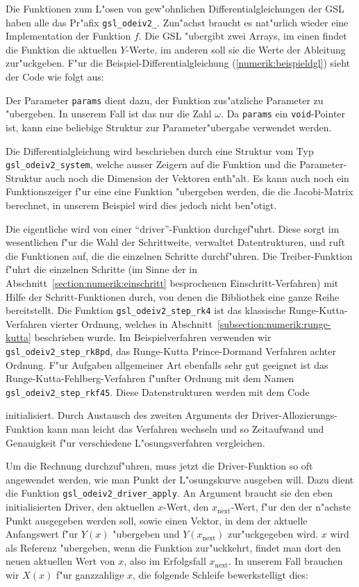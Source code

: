 Die Funktionen zum L"osen von gew"ohnlichen Differentialgleichungen
der GSL haben alle das Pr"afix \texttt{gsl\_odeiv2\_}. 
Zun"achst braucht es nat"urlich wieder eine Implementation der
Funktion $f$. 
Die GSL "ubergibt zwei Arrays, im einen findet die Funktion die aktuellen
$Y$-Werte, im anderen soll sie die Werte der Ableitung zur"uckgeben.
F"ur die Beispiel-Differentialgleichung (\ref{numerik:beispieldgl})
sieht der Code wie folgt aus:

Der Parameter \texttt{params} dient dazu, der Funktion zus"atzliche
Parameter zu "ubergeben.
In unserem Fall ist das nur die Zahl $\omega$.
Da \texttt{params} ein \texttt{void}-Pointer ist, kann eine beliebige
Struktur zur Parameter"ubergabe verwendet werden.

Die Differentialgleichung wird beschrieben durch eine Struktur vom Typ
\texttt{gsl\_odeiv2\_system}, welche ausser Zeigern auf die Funktion
und die Parameter-Struktur auch noch die Dimension der Vektoren enth"alt.
Es kann auch noch ein Funktionszeiger f"ur eine eine Funktion "ubergeben
werden, die die Jacobi-Matrix berechnet, in unserem Beispiel wird dies
jedoch nicht ben"otigt.

Die eigentliche wird von einer ``driver''-Funktion durchgef"uhrt.
Diese sorgt im wesentlichen f"ur die Wahl der Schrittweite, verwaltet
Datentrukturen, und ruft die Funktionen auf, die die einzelnen Schritte
durchf"uhren.
Die Treiber-Funktion f"uhrt die einzelnen Schritte (im Sinne der
in Abschnitt~\ref{section:numerik:einschritt} besprochenen
Einschritt-Verfahren) mit
Hilfe der Schritt-Funktionen durch, von denen die Bibliothek eine
ganze Reihe bereitstellt.
Die Funktion \texttt{gsl\_odeiv2\_step\_rk4} ist das klassische
Runge-Kutta-Verfahren vierter Ordnung, welches in
Abschnitt~\ref{subsection:numerik:runge-kutta}
beschrieben wurde.
Im Beispielverfahren verwenden wir \texttt{gsl\_odeiv2\_step\_rk8pd},
das Runge-Kutta Prince-Dormand Verfahren achter Ordnung.
F"ur Aufgaben allgemeiner Art ebenfalls sehr gut geeignet ist das
Runge-Kutta-Fehlberg-Verfahren f"unfter Ordnung mit dem Namen
\texttt{gsl\_odeiv2\_step\_rkf45}.
Diese Datenstrukturen werden mit dem Code

initialisiert.
Durch Austausch des zweiten Arguments der Driver-Allozierungs-Funktion
kann man leicht das Verfahren wechseln und so Zeitaufwand und Genauigkeit
f"ur verschiedene L"osungsverfahren vergleichen.

Um die Rechnung durchzuf"uhren, muss jetzt die Driver-Funktion so oft
angewendet werden, wie man Punkt der L"osungskurve ausgeben will.
Dazu dient die Funktion \texttt{gsl\_odeiv2\_driver\_apply}. 
An Argument braucht sie den eben initialisierten Driver, den aktuellen
$x$-Wert, den $x_{\text{next}}$-Wert, f"ur den der n"achste Punkt
ausgegeben werden soll, sowie einen Vektor, in dem der aktuelle Anfangswert
f"ur $Y(x)$ "ubergeben und $Y(x_{\text{next}})$ zur"uckgegeben wird.
$x$ wird als Referenz "ubergeben, wenn die Funktion zur"uckkehrt,
findet man dort den neuen aktuellen Wert von $x$, also im Erfolgsfall
$x_{\text{next}}$.
In unserem Fall brauchen wir $X(x)$ f"ur ganzzahlige $x$, die folgende
Schleife bewerkstelligt dies:


